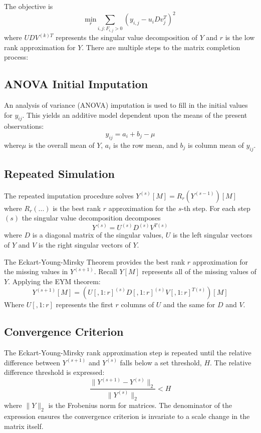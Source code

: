 \documentclass[12pt,twoside]{dukestatscithesis}
\theoremstyle{definition}
\theoremstyle{definition}
\theoremstyle{definition}
\theoremstyle{remark}
\begin{document}
The objective is
\[\underset{r}{\text{min}} \sum_{i,j:F_{i,j} > 0} (y_{i,j} - u_iDv^T_j)^2\]
where \(UDV^{(k)T}\) represents the singular value decomposition of
\(Y\) and \(r\) is the low rank approximation for \(Y\). There are
multiple steps to the matrix completion process:

\subsection{ANOVA Initial Imputation}\label{anova-initial-imputation}

An analysis of variance (ANOVA) imputation is used to fill in the
initial values for \(y_{ij}\). This yields an additive model dependent
upon the means of the present observations:
\[y_{ij} =  a_i + b_j - \mu\] where\(\mu\) is the overall mean of \(Y\),
\(a_i\) is the row mean, and \(b_j\) is column mean of \(y_{ij}\).

\subsection{Repeated Simulation}\label{repeated-simulation}

The repeated imputation procedure solves
\(Y^{(s)}[M] = R_r(Y^{(s-1)})[M]\) where \(R_r( ... )\) is the best rank
\(r\) approximation for the \(s\)-th step. For each step \((s)\) the
singular value decomposition decomposes
\[Y^{(s)} =  U^{(s)}D^{(s)}V^{T(s)}\] where \(D\) is a diagonal matrix
of the singular values, \(U\) is the left singular vectors of \(Y\) and
\(V\) is the right singular vectors of \(Y\).

The Eckart-Young-Mirsky Theorem provides the best rank \(r\)
approximation for the missing values in \(Y^{(s+1)}\). Recall \(Y[M]\)
represents all of the missing values of \(Y\). Applying the EYM theorem:
\[Y^{(s+1)}[M] = (U[,1:r]^{(s)}D[,1:r]^{(s)}V[,1:r]^{T(s)})[M]\] Where
\(U[,1:r]\) represents the first \(r\) columns of \(U\) and the same for
\(D\) and \(V\).

\subsection{Convergence Criterion}\label{convergence-criterion}

The Eckart-Young-Mirsky rank approximation step is repeated until the
relative difference between \(Y^{(s+1)}\) and \(Y^{(s)}\) falls below a
set threshold, \(H\). The relative difference threshold is expressed:
\[\frac{\|Y^{(s+1)}-Y^{(s)}\|_2}{\|Y^{(s)}\|_2} < H\] where \(\|Y\|_2\)
is the Frobenius norm for matrices. The denominator of the expression
ensures the convergence criterion is invariate to a scale change in the
matrix itself.
\end{document}
